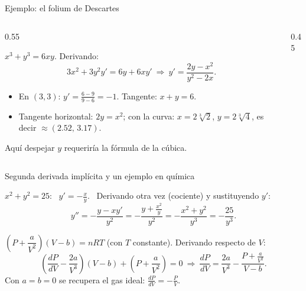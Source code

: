 \documentclass[10pt,aspectratio=169]{beamer}
\begin{document}
\begin{frame}{Ejemplo: el folium de Descartes}
  \begin{columns}
    \begin{column}{0.55\textwidth}
      \begin{ejemplo}[11]
        $x^3+y^3=6xy$. Derivando:
        \[ 3x^2+3y^2y'=6y+6xy'\ \Rightarrow\ y'=\frac{2y-x^2}{y^2-2x}. \]
        \begin{itemize}
          \item En $(3,3)$: $y'=\frac{6-9}{9-6}=-1$. Tangente: $x+y=6$.
          \item Tangente horizontal: $2y=x^2$; con la curva: $x=2\sqrt[3]{2}$, $y=2\sqrt[3]4$, es decir $\approx(2.52,\,3.17)$.
        \end{itemize}
      \end{ejemplo}
      \small Aquí despejar $y$ requeriría la fórmula de la cúbica.
    \end{column}
    \begin{column}{0.45\textwidth}
      \centering
    \end{column}
  \end{columns}
\end{frame}

\begin{frame}{Segunda derivada implícita y un ejemplo en química}
  \begin{ejemplo}[12]
    $x^2+y^2=25$: \ $y'=-\frac xy$. \ Derivando otra vez (cociente) y sustituyendo $y'$:
    \[ y''=-\frac{y-xy'}{y^2}=-\frac{y+\frac{x^2}{y}}{y^2}=-\frac{x^2+y^2}{y^3}=-\frac{25}{y^3}. \]
  \end{ejemplo}
  \begin{ejemplo}
    $\left(P+\dfrac{a}{V^2}\right)(V-b)=nRT$ (con $T$ constante). Derivando respecto de $V$:
    \[ \left(\frac{dP}{dV}-\frac{2a}{V^3}\right)(V-b)+\left(P+\frac{a}{V^2}\right)=0\ \Rightarrow\ \frac{dP}{dV}=\frac{2a}{V^3}-\frac{P+\frac a{V^2}}{V-b}. \]
    Con $a=b=0$ se recupera el gas ideal: $\frac{dP}{dV}=-\frac PV$.
  \end{ejemplo}
\end{frame}
\end{document}
